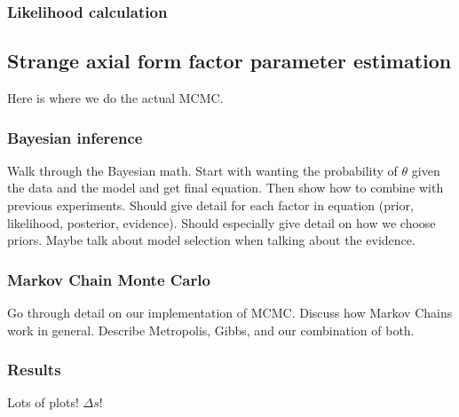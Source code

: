   \subsubsection{Likelihood calculation}

\subsection{Strange axial form factor parameter estimation}\label{deltas}
  Here is where we do the actual MCMC.
  \subsubsection{Bayesian inference}
    Walk through the Bayesian math. Start with wanting the probability of
    $\theta$ given the data and the model and get final equation. Then show how
    to combine with previous experiments. Should give detail for each factor in
    equation (prior, likelihood, posterior, evidence). Should especially give
    detail on how we choose priors. Maybe talk about model selection when
    talking about the evidence.
  \subsubsection{Markov Chain Monte Carlo}
    Go through detail on our implementation of MCMC. Discuss how Markov Chains
    work in general. Describe Metropolis, Gibbs, and our combination of both.
  \subsubsection{Results}
    Lots of plots! $\Delta s$!


